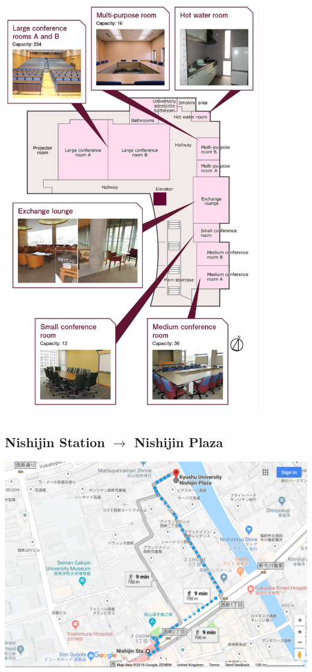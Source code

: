\noindent\includegraphics[width=0.832\textwidth]{2F.png}
\newpage
\subsection*{Nishijin Station $\rightarrow$ Nishijin Plaza}
\noindent\includegraphics[width=\textwidth]{google_map01.png}
\newpage
